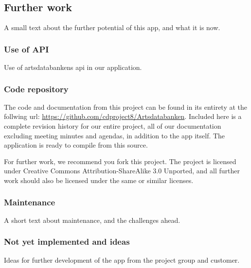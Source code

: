 \subsection{Further work}
A small text about the further potential of this app, and what it is now.
\subsubsection{Use of API}
Use of artsdatabankens api in our application.

\subsubsection{Code repository}
The code and documentation from this project can be found in its entirety at the follwing url: \url{https://github.com/cdproject8/Artsdatabanken}. Included here is a complete revision history for our entire project, all of our documentation excluding meeting minutes and agendas, in addition to the app itself. The application is ready to compile from this source.

For further work, we recommend you fork this project. The project is licensed under Creative Commons Attribution-ShareAlike 3.0 Unported, and all further work should also be licensed under the same or similar licenses.

\subsubsection{Maintenance}
A short text about maintenance, and the challenges ahead.

\subsubsection{Not yet implemented and ideas}
Ideas for further development of the app from the project group and customer.

